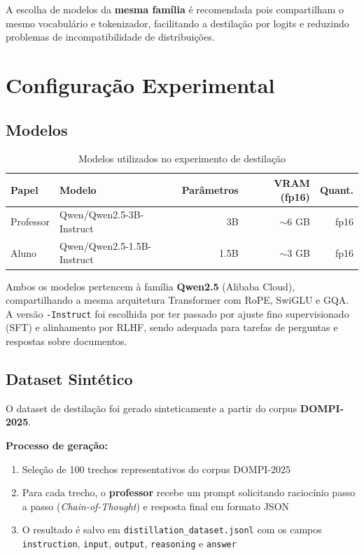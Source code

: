 \documentclass[12pt, a4paper]{article}
\begin{document}
A escolha de modelos da \textbf{mesma família} é recomendada pois compartilham o mesmo
vocabulário e tokenizador, facilitando a destilação por logits e reduzindo problemas de
incompatibilidade de distribuições.

\section{Configuração Experimental}

\subsection{Modelos}

\begin{table}[H]
\centering
\caption{Modelos utilizados no experimento de destilação}
\begin{tabular}{llrrr}
\toprule
\textbf{Papel} & \textbf{Modelo} & \textbf{Parâmetros} & \textbf{VRAM (fp16)} & \textbf{Quant.} \\
\midrule
Professor & Qwen/Qwen2.5-3B-Instruct & 3B & $\sim$6 GB & fp16 \\
Aluno     & Qwen/Qwen2.5-1.5B-Instruct & 1.5B & $\sim$3 GB & fp16 \\
\bottomrule
\end{tabular}
\end{table}

Ambos os modelos pertencem à família \textbf{Qwen2.5} (Alibaba Cloud), compartilhando
a mesma arquitetura Transformer com RoPE, SwiGLU e GQA. A versão \texttt{-Instruct}
foi escolhida por ter passado por ajuste fino supervisionado (SFT) e alinhamento por
RLHF, sendo adequada para tarefas de perguntas e respostas sobre documentos.

\subsection{Dataset Sintético}

O dataset de destilação foi gerado sinteticamente a partir do corpus
\textbf{DOMPI-2025}.

\textbf{Processo de geração:}
\begin{enumerate}
  \item Seleção de 100 trechos representativos do corpus DOMPI-2025
  \item Para cada trecho, o \textbf{professor} recebe um prompt solicitando raciocínio
        passo a passo (\textit{Chain-of-Thought}) e resposta final em formato JSON
  \item O resultado é salvo em \texttt{distillation\_dataset.jsonl} com os campos
        \texttt{instruction}, \texttt{input}, \texttt{output}, \texttt{reasoning} e \texttt{answer}
\end{enumerate}
\end{document}
